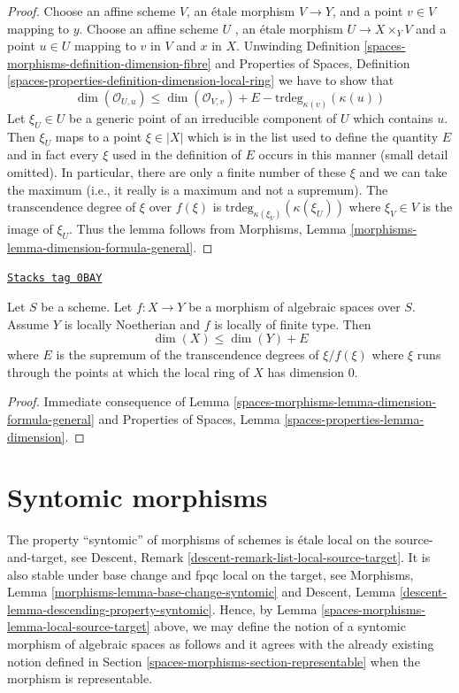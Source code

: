 \begin{proof}
Choose an affine scheme $V$, an \'etale morphism $V \to Y$, and a point
$v \in V$ mapping to $y$. Choose an affine scheme $U$ , an \'etale morphism
$U \to X \times_Y V$ and a point $u \in U$ mapping to $v$ in $V$ and $x$
in $X$. Unwinding Definition \ref{spaces-morphisms-definition-dimension-fibre} and
Properties of Spaces, Definition
\ref{spaces-properties-definition-dimension-local-ring}
we have to show that
$$
\dim(\mathcal{O}_{U, u}) \leq
\dim(\mathcal{O}_{V, v}) + E - \text{trdeg}_{\kappa(v)}(\kappa(u))
$$
Let $\xi_U \in U$ be a generic point of an irreducible component of
$U$ which contains $u$. Then $\xi_U$ maps to a point $\xi \in |X|$
which is in the list used to define the quantity $E$ and in fact
every $\xi$ used in the definition of $E$ occurs in this manner
(small detail omitted). In particular, there are only a finite
number of these $\xi$ and we can take the maximum (i.e., it really
is a maximum and not a supremum).
The transcendence degree of $\xi$ over $f(\xi)$ is
$\text{trdeg}_{\kappa(\xi_V)}(\kappa(\xi_U))$ where $\xi_V \in V$
is the image of $\xi_U$. Thus the lemma follows from
Morphisms, Lemma \ref{morphisms-lemma-dimension-formula-general}.
\end{proof}

\begin{lemma}
\label{spaces-morphisms-lemma-alteration-dimension-general}
\href{https://stacks.math.columbia.edu/tag/0BAY}{\texttt{Stacks tag 0BAY}}

Let $S$ be a scheme.
Let $f : X \to Y$ be a morphism of algebraic spaces over $S$. Assume
$Y$ is locally Noetherian and $f$ is locally of finite type.
Then
$$
\dim(X) \leq \dim(Y) + E
$$
where $E$ is the supremum of the transcendence degrees of
$\xi/f(\xi)$ where $\xi$ runs through the points at
which the local ring of $X$ has dimension $0$.
\end{lemma}

\begin{proof}
Immediate consequence of Lemma \ref{spaces-morphisms-lemma-dimension-formula-general}
and Properties of Spaces, Lemma \ref{spaces-properties-lemma-dimension}.
\end{proof}

\section{Syntomic morphisms}
\label{spaces-morphisms-section-syntomic}
The property ``syntomic'' of morphisms of schemes is
\'etale local on the source-and-target, see
Descent, Remark \ref{descent-remark-list-local-source-target}.
It is also stable under base change and fpqc local on the target, see
Morphisms, Lemma \ref{morphisms-lemma-base-change-syntomic} and
Descent, Lemma \ref{descent-lemma-descending-property-syntomic}.
Hence, by
Lemma \ref{spaces-morphisms-lemma-local-source-target}
above, we may define the notion of a syntomic morphism of algebraic spaces as
follows and it agrees with the already existing notion defined in
Section \ref{spaces-morphisms-section-representable}
when the morphism is representable.

